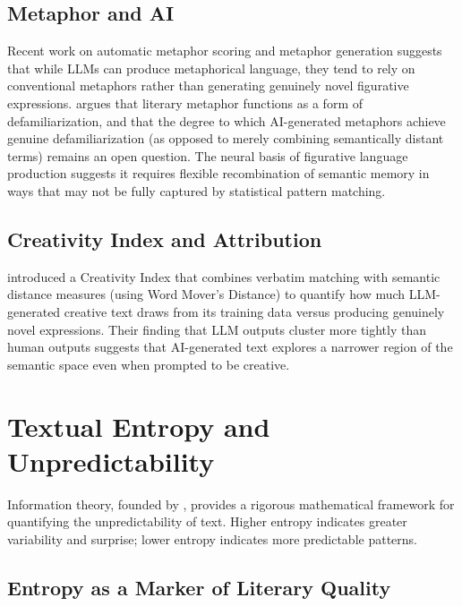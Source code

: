 \documentclass[12pt,a4paper]{article}
\begin{document}
\subsection{Metaphor and AI}

Recent work on automatic metaphor scoring \citep{do2024automatic} and metaphor generation \citep{survey_figurative2024} suggests that while LLMs can produce metaphorical language, they tend to rely on conventional metaphors rather than generating genuinely novel figurative expressions. \citet{pouscoulous2024literary} argues that literary metaphor functions as a form of defamiliarization, and that the degree to which AI-generated metaphors achieve genuine defamiliarization (as opposed to merely combining semantically distant terms) remains an open question. The neural basis of figurative language production \citep{prabhakaran2014neural} suggests it requires flexible recombination of semantic memory in ways that may not be fully captured by statistical pattern matching.

\subsection{Creativity Index and Attribution}

\citet{chakrabarty2024creativity} introduced a Creativity Index that combines verbatim matching with semantic distance measures (using Word Mover's Distance) to quantify how much LLM-generated creative text draws from its training data versus producing genuinely novel expressions. Their finding that LLM outputs cluster more tightly than human outputs suggests that AI-generated text explores a narrower region of the semantic space even when prompted to be creative.

\section{Textual Entropy and Unpredictability}

Information theory, founded by \citet{shannon1948mathematical}, provides a rigorous mathematical framework for quantifying the unpredictability of text. Higher entropy indicates greater variability and surprise; lower entropy indicates more predictable patterns.

\subsection{Entropy as a Marker of Literary Quality}
\end{document}
